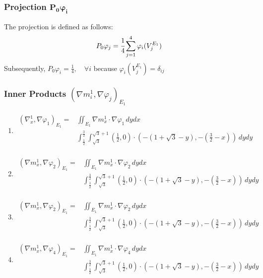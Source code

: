\documentclass{article}
\begin{document}
\subsubsection{Projection $\boldsymbol{P_0\varphi_i}$}
The projection is defined as follows:
$$P_0\varphi_j = \cfrac{1}{4}\sum_{j=1}^4\varphi_i(V_j^{E_1})$$
Subsequently, $P_0\varphi_i = \frac{1}{4}, \quad \forall i$ because  $\varphi_i(V_j^{E_1}) = \delta_{ij}$


\subsubsection{Inner Products $(\nabla m_i^1, \nabla\varphi_j)_{E_1}$}
\begin{enumerate}
    \item \begin{align*}
        (\nabla_x^1,\nabla\varphi_1)_{E_1} =& \iint_{E_1}\nabla m_x^1 \cdot \nabla\varphi_1 \,dydx \\
        & \int_{\frac{1}{2}}^\frac{3}{2}\int_{\sqrt{3}}^{\sqrt{3}+1} \left(\frac{1}{2},0\right)\cdot \left(-\left(1 + \sqrt{3} - y\right),  -\left(\frac{3}{2}-x\right)\right) \,dydy \\
    \end{align*}

    \item \begin{align*}
        (\nabla m_x^1,\nabla\varphi_2)_{E_1} =& \iint_{E_1}\nabla m_x^1 \cdot \nabla\varphi_2 \,dydx \\
        & \int_{\frac{1}{2}}^\frac{3}{2}\int_{\sqrt{3}}^{\sqrt{3}+1} \left(\frac{1}{2},0\right)\cdot \left(-\left(1 + \sqrt{3} - y\right),  -\left(\frac{3}{2}-x\right)\right) \,dydy \\
    \end{align*}

    \item \begin{align*}
        (\nabla m_x^1,\nabla\varphi_2)_{E_1} =& \iint_{E_1}\nabla m_x^1 \cdot \nabla\varphi_2 \,dydx \\
        & \int_{\frac{1}{2}}^\frac{3}{2}\int_{\sqrt{3}}^{\sqrt{3}+1} \left(\frac{1}{2},0\right)\cdot \left(-\left(1 + \sqrt{3} - y\right),  -\left(\frac{3}{2}-x\right)\right) \,dydy \\
    \end{align*}

    \item \begin{align*}
        (\nabla m_x^1,\nabla\varphi_4)_{E_1} =& \iint_{E_1}\nabla m_x^1 \cdot \nabla\varphi_4 \,dydx \\
        & \int_{\frac{1}{2}}^\frac{3}{2}\int_{\sqrt{3}}^{\sqrt{3}+1} \left(\frac{1}{2},0\right)\cdot \left(-\left(1 + \sqrt{3} - y\right),  -\left(\frac{3}{2}-x\right)\right) \,dydy \\
    \end{align*}
\end{enumerate}
\end{document}
